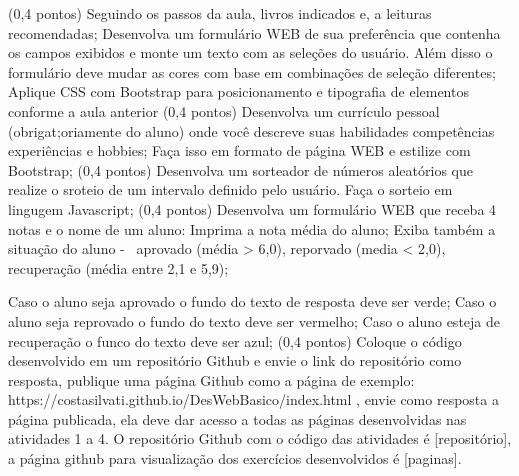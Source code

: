 (0,4 pontos) Seguindo os passos da aula, livros indicados e, a leituras recomendadas;
Desenvolva um formulário WEB de sua preferência que contenha os campos exibidos e monte um texto com as seleções do usuário.
Além disso o formulário deve mudar as cores com base em combinações de seleção diferentes;
Aplique CSS com Bootstrap para posicionamento e tipografia de elementos conforme a aula anterior
(0,4 pontos) Desenvolva um currículo pessoal (obrigat;oriamente do aluno) onde você descreve suas habilidades competências experiências e hobbies; Faça isso em formato de página WEB e estilize com Bootstrap;
(0,4 pontos) Desenvolva um sorteador de números aleatórios que realize o sroteio de um intervalo definido pelo usuário. Faça o sorteio em lingugem Javascript;
(0,4 pontos) Desenvolva um formulário WEB que receba 4 notas e o nome de um aluno:
Imprima a nota média do aluno;
Exiba também a situação do aluno -  aprovado (média > 6,0), reporvado (media < 2,0), recuperação (média entre 2,1 e 5,9);

Caso o aluno seja aprovado o fundo do texto de resposta deve ser verde;
Caso o aluno seja reprovado o fundo do texto deve ser vermelho;
Caso o aluno esteja de recuperação o funco do texto deve ser azul;
(0,4 pontos) Coloque o código desenvolvido em um repositório Github e envie o link do repositório como resposta, publique uma página Github como a página de exemplo: https://costasilvati.github.io/DesWebBasico/index.html , envie como resposta a página publicada, ela deve dar acesso a todas as páginas desenvolvidas nas atividades 1 a 4.
O repositório Github com o código das atividades é [repositório], a página github para visualização dos exercícios desenvolvidos é [paginas].